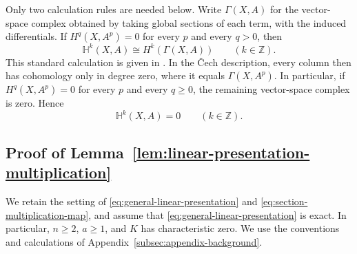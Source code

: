 \documentclass[12pt,reqno,a4paper]{amsart}
\numberwithin{equation}{section}
\numberwithin{figure}{section}
\theoremstyle{plain}
\theoremstyle{definition}
\begin{document}
Only two calculation rules are needed below.
Write $\Gamma(X,A)$ for the vector-space complex obtained by taking
global sections of each term, with the induced differentials.
If $H^q(X,A^p)=0$ for every $p$ and every $q>0$, then
\begin{equation}\label{app:eq:hypercohomology-global-sections}
 \mathbb H^k(X,A)\cong H^k(\Gamma(X,A))
       \qquad(k\in\mathbb Z).
\end{equation}
This standard calculation is given in \cite[Tag~05TA]{Stacks}.
In the \v Cech description, every column then has cohomology only
in degree zero, where it equals $\Gamma(X,A^p)$.
In particular, if $H^q(X,A^p)=0$ for every $p$ and every $q\geq0$,
the remaining vector-space complex is zero. Hence
\begin{equation}\label{app:eq:hypercohomology-zero-terms}
 \mathbb H^k(X,A)=0\qquad(k\in\mathbb Z).
\end{equation}


\subsection{Proof of Lemma~\ref{lem:linear-presentation-multiplication}}
\label{subsec:appendix-lemma-proof}

We retain the setting of \eqref{eq:general-linear-presentation}
and \eqref{eq:section-multiplication-map}, and assume that
\eqref{eq:general-linear-presentation} is exact.
In particular, $n\geq2$, $a\geq1$, and $K$ has characteristic zero.
We use the conventions and calculations of
Appendix~\ref{subsec:appendix-background}.
\end{document}

